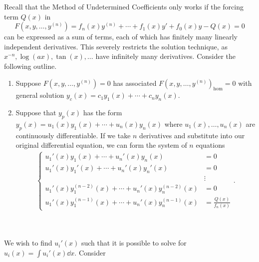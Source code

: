         Recall that the Method of Undetermined Coefficients only works if the forcing term \(Q(x)\) in
        \begin{equation*}
            F(x,y,\ldots,y^{(n)})=f_n(x)y^{(n)}+\cdots+f_1(x)y'+f_0(x)y-Q(x)=0
        \end{equation*}
        can be expressed as a sum of terms, each of which has finitely many linearly independent derivatives. This severely restricts the solution technique, as \(x^{-n},\log(ax),\tan(x),\ldots\) have infinitely many derivatives. Consider the following outline.
        \begin{enumerate}
            \item Suppose \(F(x,y,\ldots,y^{(n)})=0\) has associated \(F(x,y,\ldots,y^{(n)})_{\text{hom}}=0\) with general solution \(y_c(x)=c_1y_1(x)+\cdots+c_ny_n(x)\).
            \item Suppose that \(y_p(x)\) has the form \(y_p(x)=u_1(x)y_1(x)+\cdots+u_n(x)y_n(x)\) where \(u_1(x),\ldots,u_n(x)\) are continuously differentiable. If we take \(n\) derivatives and substitute into our original differential equation, we can form the system of \(n\) equations
            \begin{align*}
                \begin{cases}
                    u_1'(x)y_1(x)+\cdots+u_n'(x)y_n(x)&=0 \\
                    u_1'(x)y_1'(x)+\cdots+u_n'(x)y_n'(x)&=0 \\
                    &\vdots \\
                    u_1'(x)y_1^{(n-2)}(x)+\cdots+u_n'(x)y_n^{(n-2)}(x)&=0 \\
                    u_1'(x)y_1^{(n-1)}(x)+\cdots+u_n'(x)y_n^{(n-1)}(x)&=\frac{Q(x)}{f_n(x)}
                \end{cases}.
            \end{align*}
        \end{enumerate}
        \vphantom
        \\
        \\
        We wish to find \(u_i'(x)\) such that it is possible to solve for \(u_i(x)=\int u_i'(x)\dd x\). Consider

